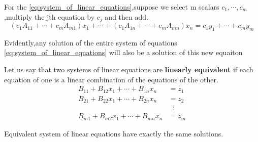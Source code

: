 \begin{definition}
	For the \ref{eq:system_of_linear_equations},suppose we select m scalars $c_1,\cdots,c_m$,multiply the jth equation by $c_j$ and then add.
	\begin{displaymath}
		(c_1A_{11}+\cdots+c_mA_{m1})x_1+\cdots+(c_1A_{1n}+\cdots+c_mA_{mn})x_n = c_1y_1+\cdots+c_my_m
	\end{displaymath}
\end{definition}

\begin{note}
	Evidently,any solution of the entire system of equations \ref{eq:system_of_linear_equations} will also be a solution of this new equaiton
\end{note}
\newpage
\begin{definition}
	Let us say that two systems of linear equations are \textbf{linearly equivalent} if each equation of one is a linear combination of the equations of the other.
	\begin{equation}
		\begin{aligned}
			B_{11}+B_{12}x_1+\cdots+B_{1n}x_n & = z_1           \\
			B_{21}+B_{22}x_1+\cdots+B_{2n}x_n & = z_2           \\
			                                  & \,\,\,\, \vdots \\
			B_{m1}+B_{m2}x_1+\cdots+B_{mn}x_n & = z_m
		\end{aligned}
		\label{eq:linear_equivalent}
	\end{equation}
\end{definition}

\begin{theorem}
	Equivalent system of linear equations have exactly the same solutions.
\end{theorem}

